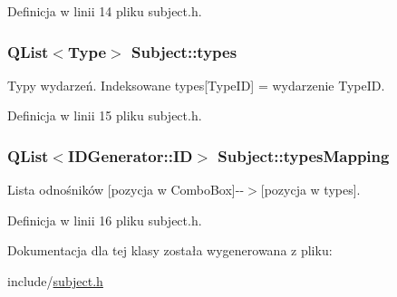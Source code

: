 Definicja w linii 14 pliku subject.h.

\hypertarget{classSubject_a05041c1516b065f1fb5f2c74c731a0a7}{
\subsubsection[{types}]{\setlength{\rightskip}{0pt plus 5cm}QList$<${\bf Type}$>$ {\bf Subject::types}}}
\label{classSubject_a05041c1516b065f1fb5f2c74c731a0a7}


Typy wydarzeń. Indeksowane types\mbox{[}TypeID\mbox{]} = wydarzenie TypeID. 



Definicja w linii 15 pliku subject.h.

\hypertarget{classSubject_a986e6137767b698f8bdef30f24c32178}{
\subsubsection[{typesMapping}]{\setlength{\rightskip}{0pt plus 5cm}QList$<${\bf IDGenerator::ID}$>$ {\bf Subject::typesMapping}}}
\label{classSubject_a986e6137767b698f8bdef30f24c32178}


Lista odnośników \mbox{[}pozycja w ComboBox\mbox{]}-\/-\/$>$\mbox{[}pozycja w types\mbox{]}. 



Definicja w linii 16 pliku subject.h.



Dokumentacja dla tej klasy została wygenerowana z pliku:\begin{DoxyCompactItemize}
\item 
include/\hyperlink{subject_8h}{subject.h}\end{DoxyCompactItemize}
